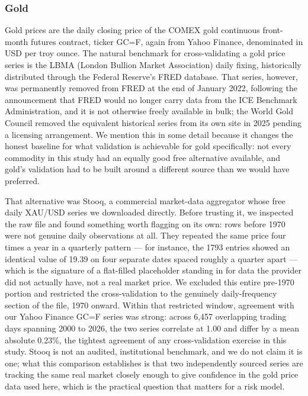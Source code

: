 \documentclass[preprint,12pt,authoryear]{elsarticle}
\begin{document}
\subsubsection{Gold}

Gold prices are the daily closing price of the COMEX gold continuous
front-month futures contract, ticker GC=F, again from Yahoo Finance,
denominated in USD per troy ounce. The natural benchmark for
cross-validating a gold price series is the LBMA (London Bullion
Market Association) daily fixing, historically distributed through
the Federal Reserve's FRED database. That series, however, was
permanently removed from FRED at the end of January 2022, following
the announcement that FRED would no longer carry data from the ICE
Benchmark Administration, and it is not otherwise freely available in
bulk; the World Gold Council removed the equivalent historical series
from its own site in 2025 pending a licensing arrangement. We
mention this in some detail because it changes the honest baseline
for what validation is achievable for gold specifically: not every
commodity in this study had an equally good free alternative
available, and gold's validation had to be built around a different
source than we would have preferred.

That alternative was Stooq, a commercial market-data aggregator whose
free daily XAU/USD series we downloaded directly. Before trusting it,
we inspected the raw file and found something worth flagging on its
own: rows before 1970 were not genuine daily observations at all.
They repeated the same price four times a year in a quarterly pattern
— for instance, the 1793 entries showed an identical value of 19.39
on four separate dates spaced roughly a quarter apart — which is the
signature of a flat-filled placeholder standing in for data the
provider did not actually have, not a real market price. We excluded
this entire pre-1970 portion and restricted the cross-validation to
the genuinely daily-frequency section of the file, 1970 onward.
Within that restricted window, agreement with our Yahoo Finance GC=F
series was strong: across 6{,}457 overlapping trading days spanning
2000 to 2026, the two series correlate at 1.00 and differ by a mean
absolute 0.23\%, the tightest agreement of any cross-validation
exercise in this study. Stooq is not an audited, institutional
benchmark, and we do not claim it is one; what this comparison
establishes is that two independently sourced series are tracking the
same real market closely enough to give confidence in the gold price
data used here, which is the practical question that matters for a
risk model.
\end{document}
